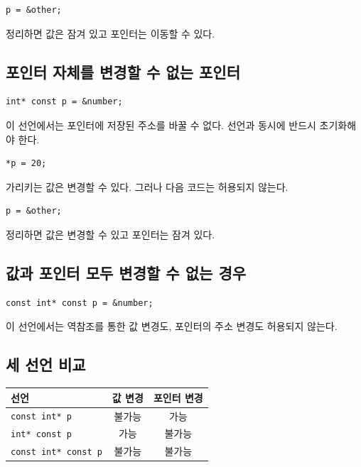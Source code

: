 \documentclass[11pt,a4paper]{article}
\begin{document}
\begin{lstlisting}
p = &other;
\end{lstlisting}

정리하면 값은 잠겨 있고 포인터는 이동할 수 있다.

\subsection{포인터 자체를 변경할 수 없는 포인터}

\begin{lstlisting}
int* const p = &number;
\end{lstlisting}

이 선언에서는 포인터에 저장된 주소를 바꿀 수 없다. 선언과 동시에 반드시 초기화해야 한다.

\begin{lstlisting}
*p = 20;
\end{lstlisting}

가리키는 값은 변경할 수 있다. 그러나 다음 코드는 허용되지 않는다.

\begin{lstlisting}
p = &other;
\end{lstlisting}

정리하면 값은 변경할 수 있고 포인터는 잠겨 있다.

\subsection{값과 포인터 모두 변경할 수 없는 경우}

\begin{lstlisting}
const int* const p = &number;
\end{lstlisting}

이 선언에서는 역참조를 통한 값 변경도, 포인터의 주소 변경도 허용되지 않는다.

\subsection{세 선언 비교}

\begin{center}
\begin{tabular}{lcc}
\toprule
선언 & 값 변경 & 포인터 변경 \\
\midrule
\texttt{const int* p} & 불가능 & 가능 \\
\texttt{int* const p} & 가능 & 불가능 \\
\texttt{const int* const p} & 불가능 & 불가능 \\
\bottomrule
\end{tabular}
\end{center}
\end{document}
